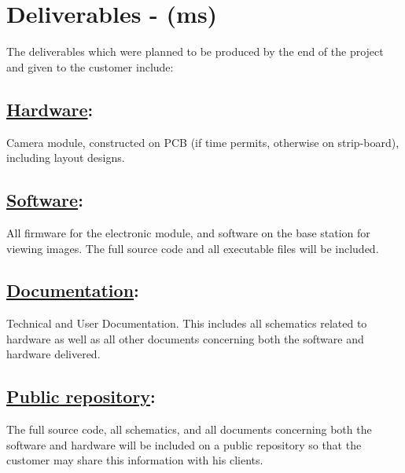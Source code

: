 \section{Deliverables - (ms)}

The deliverables which were planned to be produced by the end of the project and given to the customer include:

	\subsection{\underline{Hardware}:} 
	\label{sec:deliv_hw} 
	Camera module, constructed on PCB (if time permits, otherwise on strip-board), including layout designs.
	\subsection{\underline{Software}:} 
	\label{sec:deliv_sw} 
	All firmware for the electronic module, and software on the base station for viewing images. The full source code and all executable files will be included.
	\subsection{\underline{Documentation}:} 
	\label{sec:deliv_doc} 
	Technical and User Documentation. This includes all schematics related to hardware as well as all other documents concerning both the software and hardware delivered.
	\subsection{\underline{Public repository}:} 
	\label{sec:deliv_git} 
	The full source code, all schematics, and all documents concerning both the software and hardware will be included on a public repository so that the customer may share this information with his clients.

